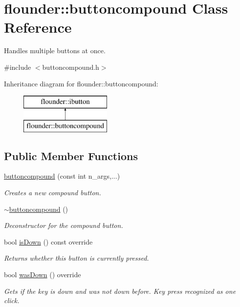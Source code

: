 \hypertarget{classflounder_1_1buttoncompound}{}\section{flounder\+:\+:buttoncompound Class Reference}
\label{classflounder_1_1buttoncompound}


Handles multiple buttons at once.  




{\ttfamily \#include $<$buttoncompound.\+h$>$}

Inheritance diagram for flounder\+:\+:buttoncompound\+:\begin{figure}[H]
\begin{center}
\leavevmode
\includegraphics[height=2.000000cm]{classflounder_1_1buttoncompound}
\end{center}
\end{figure}
\subsection*{Public Member Functions}
\begin{DoxyCompactItemize}
\item 
\hyperlink{classflounder_1_1buttoncompound_a6fc9975e305663650b46f7034efab5af}{buttoncompound} (const int n\+\_\+args,...)
\begin{DoxyCompactList}\small\item\em Creates a new compound button. \end{DoxyCompactList}\item 
\hyperlink{classflounder_1_1buttoncompound_a6abb7a06910785964c92942e7ed00ef8}{$\sim$buttoncompound} ()
\begin{DoxyCompactList}\small\item\em Deconstructor for the compound button. \end{DoxyCompactList}\item 
bool \hyperlink{classflounder_1_1buttoncompound_a60ac6caaca37cd841c725259906a9196}{is\+Down} () const override
\begin{DoxyCompactList}\small\item\em Returns whether this button is currently pressed. \end{DoxyCompactList}\item 
bool \hyperlink{classflounder_1_1buttoncompound_ae14c6ee933dbc2550f16bc6307f20989}{was\+Down} () override
\begin{DoxyCompactList}\small\item\em Gets if the key is down and was not down before. Key press recognized as one click. \end{DoxyCompactList}\end{DoxyCompactItemize}
